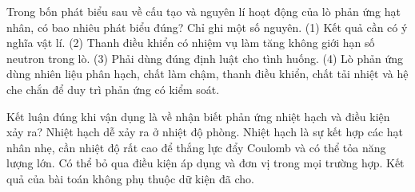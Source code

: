 \begin{ex}
Trong bốn phát biểu sau về cấu tạo và nguyên lí hoạt động của lò phản ứng hạt nhân, có bao nhiêu phát biểu đúng? Chỉ ghi một số nguyên. (1) Kết quả cần có ý nghĩa vật lí. (2) Thanh điều khiển có nhiệm vụ làm tăng không giới hạn số neutron trong lò. (3) Phải dùng đúng định luật cho tình huống. (4) Lò phản ứng dùng nhiên liệu phân hạch, chất làm chậm, thanh điều khiển, chất tải nhiệt và hệ che chắn để duy trì phản ứng có kiểm soát.
\end{ex}

\begin{ex}
Kết luận đúng khi vận dụng là về nhận biết phản ứng nhiệt hạch và điều kiện xảy ra?
\choice
{Nhiệt hạch dễ xảy ra ở nhiệt độ phòng.}
{\True Nhiệt hạch là sự kết hợp các hạt nhân nhẹ, cần nhiệt độ rất cao để thắng lực đẩy Coulomb và có thể tỏa năng lượng lớn.}
{Có thể bỏ qua điều kiện áp dụng và đơn vị trong mọi trường hợp.}
{Kết quả của bài toán không phụ thuộc dữ kiện đã cho.}
\end{ex}


